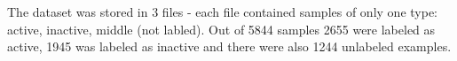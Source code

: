 \documentclass[a4paper,10pt]{report}
\begin{document}
	The dataset was stored in 3 files - each file contained samples of only one type: active, inactive, middle (not labled). Out of 5844 samples 2655 were labeled as active, 1945 was labeled as inactive and there were also 1244 unlabeled examples.\\
	

	

	    
           
	    

\end{document}
